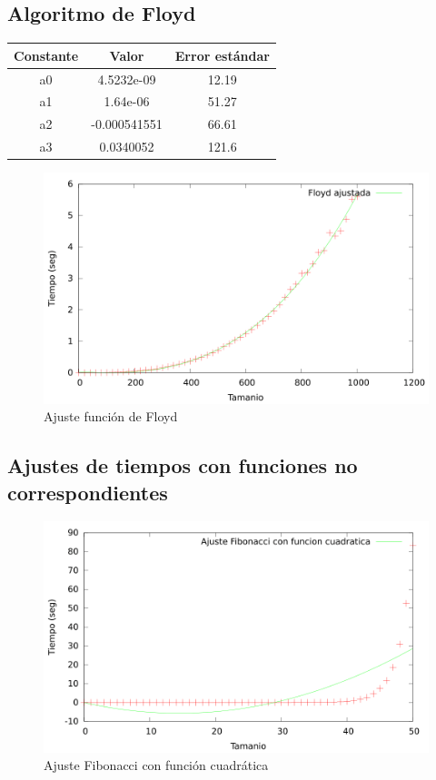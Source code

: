 \documentclass{article}
\begin{document}
	\subsection{Algoritmo de Floyd}
	
	
	\begin{longtable}{|c|c|c|}
		\hline
		Constante		& Valor			& Error estándar	\\ \hline
		a0              & 4.5232e-09	& 12.19 \\ \hline
		a1              & 1.64e-06		& 51.27 \\ \hline
		a2              & -0.000541551	& 66.61 \\ \hline
		a3              & 0.0340052		& 121.6 \\ \hline
	\end{longtable}
	
	\begin{figure}[h]
		\centering
		\includegraphics[totalheight=8cm]{img/Floyd_ajustada}
		\caption{Ajuste función de Floyd}
		\label{fig:Floyd_ajustada}
	\end{figure}
	
	\subsection{Ajustes de tiempos con funciones no correspondientes}
	
	\begin{figure}[h]
		\centering
		\includegraphics[totalheight=8cm]{img/ajusteFibonacci_cuadratico}
		\caption{Ajuste Fibonacci con función cuadrática}
		\label{fig:ajusteFibonacci_cuadratico}
	\end{figure}
	
\end{document}

